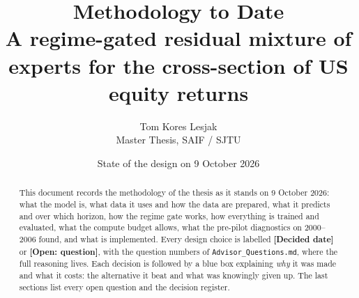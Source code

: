 \documentclass[11pt,a4paper]{article}
\title{Methodology to Date\\[4pt]
\large A regime-gated residual mixture of experts for the cross-section of US equity returns}
\author{Tom Kores Lesjak\\ \small Master Thesis, SAIF / SJTU}
\date{State of the design on 9 October 2026}
\newcommand{\dec}[1]{\textcolor{decg}{\textbf{[Decided #1]}}}
\newcommand{\open}[1]{\textcolor{openr}{\textbf{[Open: #1]}}}
\begin{document}
\maketitle
\begin{abstract}
\noindent This document records the methodology of the thesis as it stands on 9 October 2026: what the model
is, what data it uses and how the data are prepared, what it predicts and over which horizon, how the
regime gate works, how everything is trained and evaluated, what the compute budget allows, what the pre-pilot diagnostics on 2000--2006 found, and
what is implemented. Every design choice is labelled \dec{date} or \open{question}, with the question numbers of
\texttt{Advisor\_Questions.md}, where the full reasoning lives. Each decision is followed by a blue
box explaining \emph{why} it was made and what it costs: the alternative it beat and what was knowingly
given up. The last sections list every open question
and the decision register.
\end{abstract}
\tableofcontents
\newpage














\appendix


\end{document}
